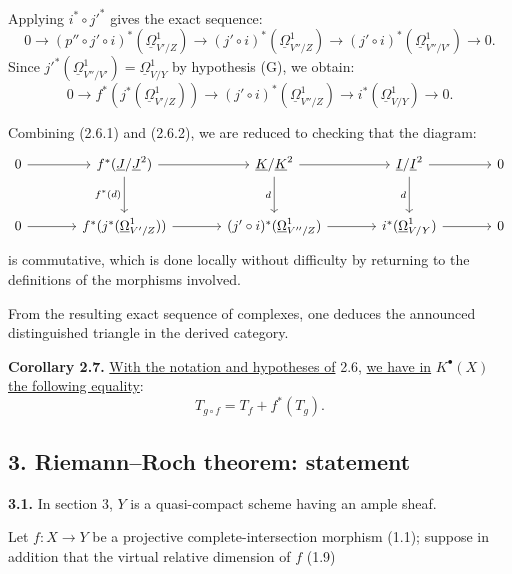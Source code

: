 %
Applying
$i^*\circ j'^*$ gives the exact sequence:
\[
0\longrightarrow (p''\circ j'\circ i)^*(\underline{\Omega}^1_{V'/Z})\longrightarrow (j'\circ i)^*(\underline{\Omega}^1_{V''/Z})\longrightarrow (j'\circ i)^*(\underline{\Omega}^1_{V''/V'})\longrightarrow0.
\]
Since $j'^*(\underline{\Omega}^1_{V''/V'})=\underline{\Omega}^1_{V/Y}$ by hypothesis (G), we obtain:
\begin{equation}\tag{2.6.2}
0\longrightarrow f^*(j^*(\underline{\Omega}^1_{V'/Z}))\longrightarrow (j'\circ i)^*(\underline{\Omega}^1_{V''/Z})\longrightarrow i^*(\underline{\Omega}^1_{V/Y})\longrightarrow0.
\end{equation}

Combining (2.6.1) and (2.6.2), we are reduced to checking that the diagram:
\[
\begin{tikzcd}[column sep=large,row sep=large]
0 \arrow[r] & f^*(\underline{J}/\underline{J}^2) \arrow[r] \arrow[d,"f^*(d)"'] & \underline{K}/\underline{K}^2 \arrow[r] \arrow[d,"d"'] & \underline{I}/\underline{I}^2 \arrow[r] \arrow[d,"d"'] & 0\\
0 \arrow[r] & f^*(j^*(\underline{\Omega}^1_{V'/Z})) \arrow[r] & (j'\circ i)^*(\underline{\Omega}^1_{V''/Z}) \arrow[r] & i^*(\underline{\Omega}^1_{V/Y}) \arrow[r] & 0
\end{tikzcd}
\]
is commutative, which is done locally without difficulty by returning to the definitions of the morphisms involved.

From the resulting exact sequence of complexes, one deduces the announced distinguished triangle in the derived category.

\textbf{Corollary 2.7.} \uline{With the notation and hypotheses of} 2.6, \uline{we have in} $K^{\bullet}(X)$ \uline{the following equality}:
\[
T_{g\circ f}=T_f+f^*(T_g).
\]

\subsection*{3. Riemann--Roch theorem: statement}

\textbf{3.1.} In section 3, $Y$ is a quasi-compact scheme having an ample sheaf.

Let $f:X\to Y$ be a projective complete-intersection morphism (1.1); suppose in addition that the virtual relative dimension of $f$ (1.9)

